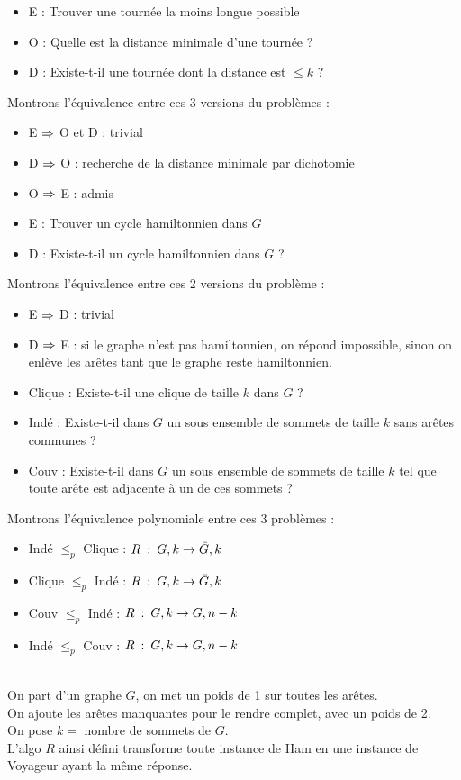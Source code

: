 \begin{itemize}
	\item E : Trouver une tournée la moins longue possible
	\item O : Quelle est la distance minimale d'une tournée ?
	\item D : Existe-t-il une tournée dont la distance est $\leq k$ ?
\end{itemize}
Montrons l'équivalence entre ces 3 versions du problèmes :
\begin{itemize}
	\item E $\Rightarrow$ O et D : trivial
	\item D $\Rightarrow$ O : recherche de la distance minimale par dichotomie
	\item O $\Rightarrow$ E : admis
\end{itemize}

\begin{itemize}
	\item E : Trouver un cycle hamiltonnien dans $G$
	\item D : Existe-t-il un cycle hamiltonnien dans $G$ ?
\end{itemize}
Montrons l'équivalence entre ces 2 versions du problème :
\begin{itemize}
	\item E $\Rightarrow$ D : trivial
	\item D $\Rightarrow$ E : si le graphe n'est pas hamiltonnien, on répond impossible, sinon on enlève les arêtes tant que le graphe reste hamiltonnien.
\end{itemize}
\newpage

\begin{itemize}
	\item Clique : Existe-t-il une clique de taille $k$ dans $G$ ?
	\item Indé : Existe-t-il dans $G$ un sous ensemble de sommets de taille $k$ sans arêtes communes ?
	\item Couv : Existe-t-il dans $G$ un sous ensemble de sommets de taille $k$ tel que toute arête est adjacente à un de ces sommets ?
\end{itemize}
Montrons l'équivalence polynomiale entre ces 3 problèmes :
\begin{itemize}
	\item Indé $\leq_p$ Clique : $R \: : \: G,k \rightarrow \bar{G},k$
	\item Clique $\leq_p$ Indé : $R \: : \: G,k \rightarrow \bar{G},k$
	\item Couv $\leq_p$ Indé : $R \: : \: G,k \rightarrow G,n-k$
	\item Indé $\leq_p$ Couv : $R \: : \: G,k \rightarrow G,n-k$
\end{itemize}

\\
On part d'un graphe $G$, on met un poids de 1 sur toutes les arêtes.\\
On ajoute les arêtes manquantes pour le rendre complet, avec un poids de 2. \\
On pose $k = $ nombre de sommets de $G$. \\
L'algo $R$ ainsi défini transforme toute instance de Ham en une instance de Voyageur ayant la même réponse.
